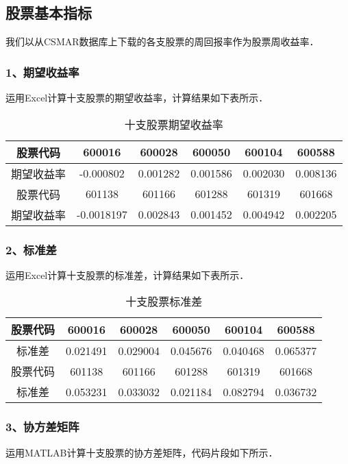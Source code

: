
\subsection{股票基本指标}
我们以从CSMAR数据库上下载的各支股票的周回报率作为股票周收益率．

\subsubsection{1、期望收益率}
运用Excel计算十支股票的期望收益率，计算结果如下表所示．

\begin{table}[ht]
\centering
\caption{十支股票期望收益率}\label{inv9_tab1}
\begin{tabular}{|c|c|c|c|c|c|}
\hline
股票代码 &600016 & 600028 & 600050 & 600104 &	600588 \\
\hline
期望收益率 &-0.000802&0.001282&0.001586	&0.002030&0.008136\\
\hline
股票代码 &601138&601166&601288&601319&601668\\
\hline
期望收益率&-0.0018197&0.002843&0.001452&0.004942	&0.002205\\
\hline
\end{tabular}
\end{table}

\subsubsection{2、标准差}
运用Excel计算十支股票的标准差，计算结果如下表所示．

\begin{table}[ht]
\centering
\caption{十支股票标准差}\label{inv9_tab2}
\begin{tabular}{|c|c|c|c|c|c|}
\hline
股票代码 &600016 & 600028 & 600050 & 600104 &	600588 \\
\hline
标准差 &0.021491&0.029004&0.045676&0.040468&0.065377\\
\hline
股票代码 &601138&601166&601288&601319&601668\\
\hline
标准差&0.053231&0.033032&0.021184&0.082794&0.036732\\
\hline
\end{tabular}
\end{table}
\subsubsection{3、协方差矩阵}
运用MATLAB计算十支股票的协方差矩阵，代码片段如下所示．

